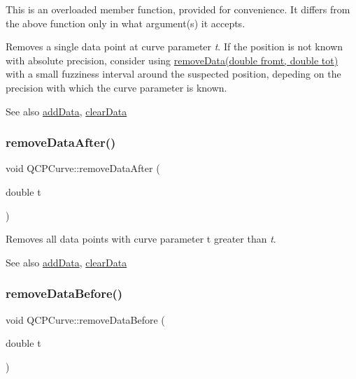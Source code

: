 This is an overloaded member function, provided for convenience. It differs from the above function only in what argument(s) it accepts.

Removes a single data point at curve parameter {\itshape t}. If the position is not known with absolute precision, consider using \hyperlink{class_q_c_p_curve_ad45bb5479be799163028ef2b776f7221}{remove\+Data(double fromt, double tot)} with a small fuzziness interval around the suspected position, depeding on the precision with which the curve parameter is known.

\begin{DoxySeeAlso}{See also}
\hyperlink{class_q_c_p_curve_a4e24023c3b9ac75440c7a260172c99af}{add\+Data}, \hyperlink{class_q_c_p_curve_ae0462c61dbfbac07db0736ec64110241}{clear\+Data} 
\end{DoxySeeAlso}
\hypertarget{class_q_c_p_curve_a0365cb947c4e6d405ee22e00191d5f52}{}\label{class_q_c_p_curve_a0365cb947c4e6d405ee22e00191d5f52} 
\subsubsection{\texorpdfstring{remove\+Data\+After()}{removeDataAfter()}}
{\footnotesize\ttfamily void Q\+C\+P\+Curve\+::remove\+Data\+After (\begin{DoxyParamCaption}\item[{double}]{t }\end{DoxyParamCaption})}

Removes all data points with curve parameter t greater than {\itshape t}. \begin{DoxySeeAlso}{See also}
\hyperlink{class_q_c_p_curve_a4e24023c3b9ac75440c7a260172c99af}{add\+Data}, \hyperlink{class_q_c_p_curve_ae0462c61dbfbac07db0736ec64110241}{clear\+Data} 
\end{DoxySeeAlso}
\hypertarget{class_q_c_p_curve_af6f4284fbc2f34e676f24dce03c34fe5}{}\label{class_q_c_p_curve_af6f4284fbc2f34e676f24dce03c34fe5} 
\subsubsection{\texorpdfstring{remove\+Data\+Before()}{removeDataBefore()}}
{\footnotesize\ttfamily void Q\+C\+P\+Curve\+::remove\+Data\+Before (\begin{DoxyParamCaption}\item[{double}]{t }\end{DoxyParamCaption})}

